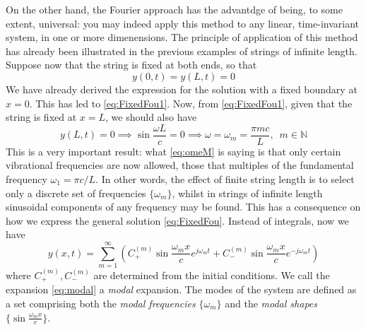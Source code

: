 On the other hand, the Fourier approach has the advantdge of being, to some extent, universal: you may indeed apply this method to any linear, time-invariant system, in one or more dimenensions. The principle of application of this method has already been illustrated in the previous examples of strings of infinite length. Suppose now that the string is fixed at both ends, so that
\begin{equation}
y(0,t) = y(L,t) = 0
\end{equation}
We have already derived the expression for the solution with a fixed boundary at $x=0$. This has led to \eqref{eq:FixedFou1}. Now, from \eqref{eq:FixedFou1}, given that the string is fixed at $x=L$, we should also have
\begin{equation}\label{eq:omeM}
y(L,t) = 0 \implies \sin \frac{\omega L}{c} = 0 \implies \omega = \omega_m = \frac{\pi m c}{L}, \,\,\, m \in \mathbb{N}
\end{equation}
This is a very important result: what \eqref{eq:omeM} is saying is that only certain vibrational frequencies are now allowed, those that multiples of the fundamental frequency $\omega_1 = \pi c / L$. In other words, the effect of finite string length is to select only a discrete set of frequencies $\{ \omega_m \}$, whilst in strings of infinite length sinusoidal components of any frequency may be found. This has a consequence on how we express the general solution \eqref{eq:FixedFou}. Instead of integrals, now we have
\begin{equation}\label{eq:modal}
y(x,t) = \sum_{m=1}^{\infty } \left( C_+^{(m)} \sin \frac{\omega_m x}{c} e^{j \omega_m t} +  C_-^{(m)} \sin \frac{\omega_m x}{c} e^{-j \omega_m t} \right)
\end{equation}
where $C_+^{(m)},C_-^{(m)}$ are determined from the initial conditions. We call the expansion \eqref{eq:modal} a \emph{modal} expansion. The modes of the system are defined as a set comprising both the \emph{modal frequencies} $\{ \omega_m \}$ and the \emph{modal shapes} $\{\sin \frac{\omega_m x}{c}\}$.

\medskip \medskip 

